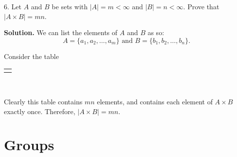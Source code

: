 \documentclass[10pt,]{book}
\theoremstyle{plain}
\theoremstyle{definition}
\theoremstyle{definition}
\theoremstyle{definition}
\theoremstyle{definition}
\numberwithin{equation}{section}
\newlength{\panelmax}
\newcommand{\lt}{<}
\begin{document}
\begin{exerciselist}
\item[6.]\hypertarget{exercise-6}{}Let \(A \) and \(B\) be sets with \(|A|=m\lt \infty\) and \(|B|=n\lt  \infty\). Prove that \(|A\times B|=mn\).%
\par\smallskip
\par\smallskip
\noindent\textbf{Solution.}\hypertarget{solution-6}{}\quad
We can list the elements of \(A\) and \(B\) as so:%
\begin{equation*}
A=\{a_1,a_2,\ldots, a_m\} \mbox{ and } B=\{b_1,b_2,\ldots, b_n\}.
\end{equation*}
%
\par
Consider the table%
{%
\setlength{\panelmax}{0pt}
\newsavebox{\panelboxCtabular}
\newlength{\phCtabular}\setlength{\phCtabular}{\ht\panelboxCtabular+\dp\panelboxCtabular}
\settototalheight{\phCtabular}{\usebox{\panelboxCtabular}}
\setlength{\panelmax}{\maxof{\panelmax}{\phCtabular}}
\leavevmode%
\setlength{\tabcolsep}{0\linewidth}
\par\medskip\noindent
\begin{tabular}{@{}*{1}{c}@{}}
\begin{minipage}[c][\panelmax][t]{1\linewidth}\usebox{\panelboxCtabular}\end{minipage}\end{tabular}\\
}%
\par
Clearly this table contains \(mn\) elements, and contains each element of \(A\times B\) exactly once. Therefore, \(|A\times B|=mn\).%
\end{exerciselist}
\typeout{************************************************}
\typeout{************************************************}
\chapter[{Groups}]{Groups}\label{gps}
\typeout{************************************************}
\typeout{************************************************}
\end{document}

